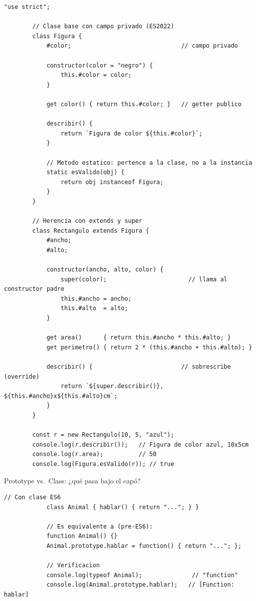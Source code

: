 \documentclass[11pt,a4paper,openany]{book}
\begin{document}
	\begin{lstlisting}[style=js,caption={Clases ES6 con herencia y campos privados},
		label=lst:4.9]
		"use strict";
		
		// Clase base con campo privado (ES2022)
		class Figura {
			#color;                               // campo privado
			
			constructor(color = "negro") {
				this.#color = color;
			}
			
			get color() { return this.#color; }   // getter publico
			
			describir() {
				return `Figura de color ${this.#color}`;
			}
			
			// Metodo estatico: pertence a la clase, no a la instancia
			static esValido(obj) {
				return obj instanceof Figura;
			}
		}
		
		// Herencia con extends y super
		class Rectangulo extends Figura {
			#ancho;
			#alto;
			
			constructor(ancho, alto, color) {
				super(color);                       // llama al constructor padre
				this.#ancho = ancho;
				this.#alto  = alto;
			}
			
			get area()      { return this.#ancho * this.#alto; }
			get perimetro() { return 2 * (this.#ancho + this.#alto); }
			
			describir() {                         // sobrescribe (override)
				return `${super.describir()}, ${this.#ancho}x${this.#alto}cm`;
			}
		}
		
		const r = new Rectangulo(10, 5, "azul");
		console.log(r.describir());   // Figura de color azul, 10x5cm
		console.log(r.area);          // 50
		console.log(Figura.esValido(r)); // true
	\end{lstlisting}
	
	\begin{cajacompara}{Prototype vs.\ Class: ¿qué pasa bajo el capó?}
		\begin{lstlisting}[style=js,numbers=none]
			// Con clase ES6
			class Animal { hablar() { return "..."; } }
			
			// Es equivalente a (pre-ES6):
			function Animal() {}
			Animal.prototype.hablar = function() { return "..."; };
			
			// Verificacion
			console.log(typeof Animal);              // "function"
			console.log(Animal.prototype.hablar);   // [Function: hablar]
		\end{lstlisting}
	\end{cajacompara}
	
\end{document}
